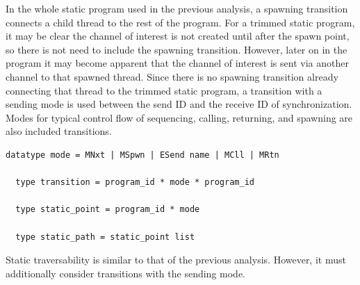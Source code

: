 \documentclass{article}
\begin{document}
In the whole static program used in the previous analysis, a spawning transition
connects a child thread to the rest of the program.  For a trimmed static program,
it may be clear the channel of interest is not created until after the spawn point,
so there is not need to include the spawning transition.  However, later on in the
program it may become apparent that the channel of interest is sent via another channel to
that spawned thread.  Since there is no spawning transition already connecting that
thread to the trimmed static program, a transition with a sending mode is used between the
send ID and the receive ID of synchronization. Modes for typical control flow of
sequencing, calling, returning, and spawning are also included transitions.

\begin{lstlisting}[language=logic, mathescape]
  datatype mode = MNxt | MSpwn | ESend name | MCll | MRtn

  type transition = program_id * mode * program_id

  type static_point = program_id * mode

  type static_path = static_point list
\end{lstlisting}

Static traversability is similar to that of the previous analysis.
However, it must additionally consider transitions with the sending mode. 
\end{document}

